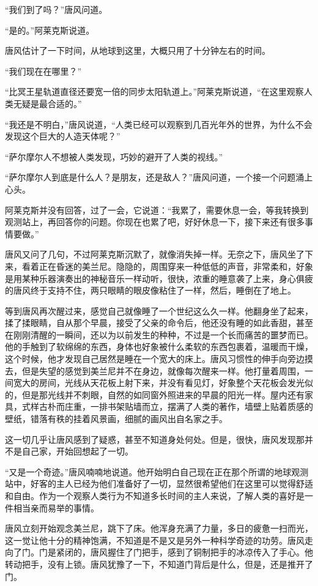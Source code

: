 “我们到了吗？”唐风问道。

“是的。”阿莱克斯说道。

唐风估计了一下时间，从地球到这里，大概只用了十分钟左右的时间。

“我们现在在哪里？”

“比冥王星轨道直径还要宽一倍的同步太阳轨道上。”阿莱克斯说道，“在这里观察人类无疑是最合适的。”

“我还是不明白，”唐风说道，“人类已经可以观察到几百光年外的世界，为什么不会发现这个巨大的人造天体呢？”

“萨尔摩尔人不想被人类发现，巧妙的避开了人类的视线。”

“萨尔摩尔人到底是什么人？是朋友，还是敌人？”唐风问道，一个接一个问题涌上心头。

阿莱克斯并没有回答，过了一会，它说道：“我累了，需要休息一会，等我转换到观测站上，再回答你的问题。你现在也累了吧，好好休息一下，接下来还有很多事情要做。”

唐风又问了几句，不过阿莱克斯沉默了，就像消失掉一样。无奈之下，唐风坐了下来，看着正在昏迷的美兰尼。隐隐的，周围穿来一种低低的声音，非常柔和，好象是用某种乐器演奏出的神秘音乐一样动听，很快，浓重的睡意袭了上来，身心俱疲的唐风终于支持不住，两只眼睛的眼皮像粘住了一样，然后，睡倒在了地上。

等到唐风再次醒过来，感觉自己就像睡了一个世纪这么久一样。他翻身坐了起来，揉了揉眼睛，自从那个早晨，接受了父亲的命令后，他还没有睡的如此香甜，甚至在刚刚清醒的一瞬间，还以为以前发生的种种，不过是一个长而痛苦的噩梦而已。他的手触到了软绵绵的东西，身体也好象被什么柔软的东西包裹着，温暖而干燥，这个时候，他才发现自己居然是睡在一个宽大的床上。唐风习惯性的伸手向旁边摸去，但是失望的感觉到美兰尼并不在身边，就像每次醒来一样。他打量着周围，一间宽大的房间，光线从天花板上射下来，并没有看见灯，好象整个天花板会发光似的，但是那光线并不刺眼，自然的如同窗外照进来的早晨的阳光一样。屋内还有家具，式样古朴而庄重，一排书架贴墙而立，摆满了人类的著作，墙壁上贴着质感的壁纸，错落有秩的挂着风景画，细腻的画风出自名家之手。

这一切几乎让唐风感到了疑惑，甚至不知道身处何处。但是，很快，唐风发现那并不是自己家，开始回想起了一切。

“又是一个奇迹。”唐风喃喃地说道。他开始明白自己现在正在那个所谓的地球观测站中，好客的主人已经为他们准备好了一切，显然很希望他们在这里可以觉得舒适和自由。作为一个观察人类行为不知道多长时间的主人来说，了解人类的喜好是一件相当亲而易举的事情。

唐风立刻开始观念美兰尼，跳下了床。他浑身充满了力量，多日的疲惫一扫而光，这一觉让他十分的精神饱满，不知道是不是又是另外一种科学奇迹的功劳。唐风走向了门。门是紧闭的，唐风握住了门把手，感到了铜制把手的冰凉传入了手心。他转动把手，没有上锁。唐风犹豫了一下，不知道门背后是什么，但是，还是推开了门。

